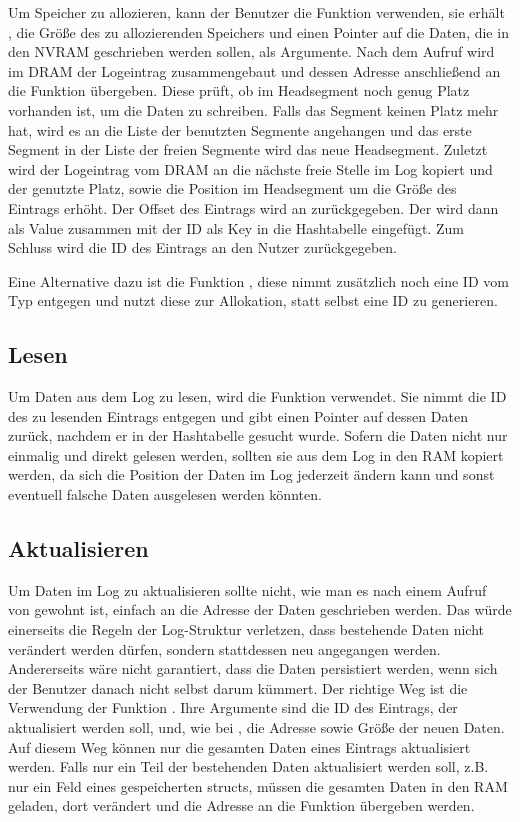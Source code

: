\documentclass{class/thesis}
\begin{document}
\begin{thesis}
	Um Speicher zu allozieren, kann der Benutzer die Funktion  verwenden, sie erhält , die Größe des zu allozierenden Speichers und einen Pointer auf die Daten, die in den NVRAM geschrieben werden sollen, als Argumente. Nach dem Aufruf wird im DRAM der Logeintrag zusammengebaut und dessen Adresse anschließend an die Funktion  übergeben.
	Diese prüft, ob im Headsegment noch genug Platz vorhanden ist, um die Daten zu schreiben. Falls das Segment keinen Platz mehr hat, wird es an die Liste der benutzten Segmente angehangen und das erste Segment in der Liste der freien Segmente wird das neue Headsegment.
	Zuletzt wird der Logeintrag vom DRAM an die nächste freie Stelle im Log kopiert und der genutzte Platz, sowie die Position im Headsegment um die Größe des Eintrags erhöht. Der Offset des Eintrags wird an  zurückgegeben. 
	Der wird dann als Value zusammen mit der ID als Key in die Hashtabelle eingefügt. Zum Schluss wird die ID des Eintrags an den Nutzer zurückgegeben.
	
	Eine Alternative dazu ist die Funktion , diese nimmt zusätzlich noch eine ID vom Typ  entgegen und nutzt diese zur Allokation, statt selbst eine ID zu generieren.
	
	
	\subsection{Lesen}
	
	Um Daten aus dem Log zu lesen, wird die Funktion  verwendet. Sie nimmt die ID des zu lesenden Eintrags entgegen und gibt einen Pointer auf dessen Daten zurück, nachdem er in der Hashtabelle gesucht wurde.
	Sofern die Daten nicht nur einmalig und direkt gelesen werden, sollten sie aus dem Log in den RAM kopiert werden, da sich die Position der Daten im Log jederzeit ändern kann und sonst eventuell falsche Daten ausgelesen werden könnten.
	
	
	\subsection{Aktualisieren}
	
	Um Daten im Log zu aktualisieren sollte nicht, wie man es nach einem Aufruf von  gewohnt ist, einfach an die Adresse der Daten geschrieben werden. 
	Das würde einerseits die Regeln der Log-Struktur verletzen, dass bestehende Daten nicht verändert werden dürfen, sondern stattdessen neu angegangen werden. Andererseits wäre nicht garantiert, dass die Daten persistiert werden, wenn sich der Benutzer danach nicht selbst darum kümmert.
	Der richtige Weg ist die Verwendung der Funktion . Ihre Argumente sind die ID des Eintrags, der aktualisiert werden soll, und, wie bei , die Adresse sowie Größe der neuen Daten.
	Auf diesem Weg können nur die gesamten Daten eines Eintrags aktualisiert werden. Falls nur ein Teil der bestehenden Daten aktualisiert werden soll, z.B. nur ein Feld eines gespeicherten structs, müssen die gesamten Daten in den RAM geladen, dort verändert und die Adresse an die Funktion übergeben werden.
	

\end{thesis}
\end{document}
